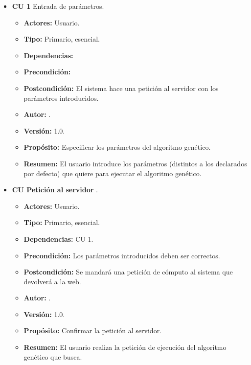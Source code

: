 \begin{itemize}
	
	\item \textbf{CU 1} Entrada de parámetros.
	\begin{itemize}
		\item \textbf{Actores:} Usuario.
		\item \textbf{Tipo:} Primario, esencial.
		\item \textbf{Dependencias:}
		\item \textbf{Precondición:}
		\item \textbf{Postcondición:} El sistema hace una petición al servidor con los parámetros introducidos.
		\item\textbf{ Autor:} {\autor}.
		\item \textbf{Versión:} 1.0.
		\item \textbf{Propósito:} Especificar los parámetros del algoritmo genético.
		\item \textbf{Resumen:} El usuario introduce los parámetros (distintos a los declarados por defecto) que quiere para ejecutar el algoritmo genético. 
	\end{itemize}
	
	\item \textbf{CU Petición al servidor} .
	\begin{itemize}
		\item \textbf{Actores:} Usuario.
		\item \textbf{Tipo:} Primario, esencial.
		\item \textbf{Dependencias:} CU 1.
		\item \textbf{Precondición:} Los parámetros introducidos deben ser correctos.
		\item \textbf{Postcondición:} Se mandará una petición de cómputo al sistema que devolverá a la web.
		\item\textbf{ Autor:} {\autor}.
		\item \textbf{Versión:} 1.0.
		\item \textbf{Propósito:} Confirmar la petición al servidor.
		\item \textbf{Resumen:} El usuario realiza la petición de ejecución del algoritmo genético que busca.
	\end{itemize}


\end{itemize}
